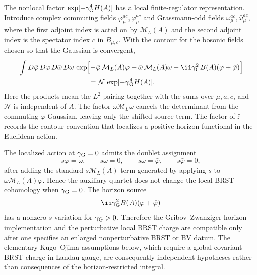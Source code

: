 The nonlocal factor \(\exp[-\gamma_{\rm G}^4H(A)]\) has a local
finite-regulator representation.  Introduce complex commuting fields
\(\varphi_\mu^{ac},\bar\varphi_\mu^{ac}\) and Grassmann-odd fields
\(\omega_\mu^{ac},\bar\omega_\mu^{ac}\), where the first adjoint index is
acted on by \(\mathcal M_L(A)\) and the second adjoint index is the spectator
index \(c\) in \(B_{\mu,c}\).  With the contour for the bosonic fields chosen
so that the Gaussian is convergent,
\begin{equation}
\begin{aligned}
 &\int D\bar\varphi\,D\varphi\,D\bar\omega\,D\omega\,
  \exp\Bigl[
  -\bar\varphi\,\mathcal M_L(A)\varphi
  +\bar\omega\,\mathcal M_L(A)\omega
  -\ii\gamma_{\rm G}^2 B(A)(\varphi+\bar\varphi)
  \Bigr]
\\
 &\hspace{3.5cm}
  =
  \mathcal N\,
  \exp[-\gamma_{\rm G}^4H(A)] .
\end{aligned}
  \label{eq:gz-localization-gaussian}
\end{equation}
Here the products mean the \(L^2\) pairing together with the sums over
\(\mu,a,c\), and \(\mathcal N\) is independent of \(A\).  The factor
\(\bar\omega\mathcal M_L\omega\) cancels the determinant from the
commuting \(\varphi\)-Gaussian, leaving only the shifted source term.  The
factor of \(\ii\) records the contour convention that localizes a positive
horizon functional in the Euclidean action.

The localized action at \(\gamma_{\rm G}=0\) admits the doublet assignment
\[
  s\varphi=\omega,\qquad s\omega=0,\qquad
  s\bar\omega=\bar\varphi,\qquad s\bar\varphi=0,
\]
after adding the standard \(s\mathcal M_L(A)\) term generated by applying
\(s\) to \(\bar\omega\mathcal M_L(A)\varphi\).  Hence the auxiliary quartet
does not change the local BRST cohomology when \(\gamma_{\rm G}=0\).  The
horizon source
\[
  \ii\gamma_{\rm G}^2 B(A)(\varphi+\bar\varphi)
\]
has a nonzero \(s\)-variation for \(\gamma_{\rm G}>0\).  Therefore the
Gribov--Zwanziger horizon implementation and the perturbative local BRST
charge are compatible only after one specifies an enlarged nonperturbative
BRST or BV datum.  The elementary Kugo--Ojima assumptions below, which require
a global covariant BRST charge in Landau gauge, are consequently independent
hypotheses rather than consequences of the horizon-restricted integral.

